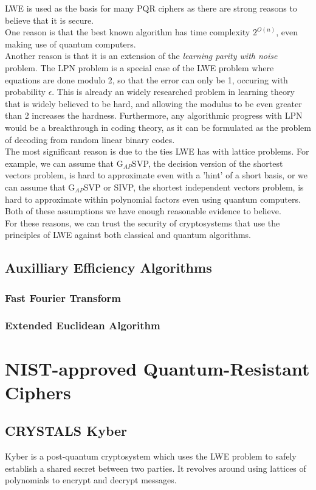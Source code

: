 \documentclass{article}
\begin{document}
LWE is used as the basis for many PQR ciphers as there are strong reasons to believe that it is secure.
\\
One reason is that the best known algorithm has time complexity $2^{O(n)}$, even making use of quantum computers.
\\
Another reason is that it is an extension of the \textit{learning parity with
noise} problem. The LPN problem is a special case of the LWE problem where
equations are done modulo 2, so that the error can only be 1, occuring with
probability $\epsilon$. This is already an widely researched problem in learning
theory that is widely believed to be hard, and allowing the modulus to be even
greater than 2 increases the hardness. Furthermore, any algorithmic progress
with LPN would be a breakthrough in coding theory, as it can be formulated as
the problem of decoding from random linear binary codes.
\\
The most significant reason is due to the ties LWE has with lattice problems.
For example, we can assume that G$_{AP}$SVP, the decision version of the
shortest vectors problem, is hard to approximate even with a 'hint' of a short
basis, or we can assume that G$_{AP}$SVP or SIVP, the shortest independent
vectors problem, is hard to approximate within polynomial factors even using
quantum computers. Both of these assumptions we have enough reasonable evidence
to believe.
\\
For these reasons, we can trust the security of cryptosystems that use the principles
of LWE against both classical and quantum algorithms.

\subsection{Auxilliary Efficiency Algorithms}
\subsubsection{Fast Fourier Transform}
\subsubsection{Extended Euclidean Algorithm}

\section{NIST-approved Quantum-Resistant Ciphers}
\subsection{CRYSTALS Kyber}
Kyber is a post-quantum cryptosystem which uses the LWE problem to safely establish a shared secret between two parties.
It revolves around using lattices of polynomials to encrypt and decrypt messages.
\end{document}
